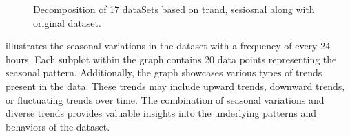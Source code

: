 \documentclass[a4paper, fleqn]{cas-sc}
\theoremstyle{definition}
\theoremstyle{remark}
\begin{document}
\begin{itemize}
\begin{figure}[h!]
  \centering
  \caption{Decomposition of 17 dataSets based on trand,  sesiosnal along with original dataset.}
  \label{Eda}
\end{figure}
 illustrates the seasonal variations in the dataset with a frequency of every 24 hours. Each subplot within the graph contains 20 data points representing the seasonal pattern. Additionally,  the graph showcases various types of trends present in the data. These trends may include upward trends,  downward trends,  or fluctuating trends over time. The combination of seasonal variations and diverse trends provides valuable insights into the underlying patterns and behaviors of the dataset.
\end{itemize}
\end{document}
